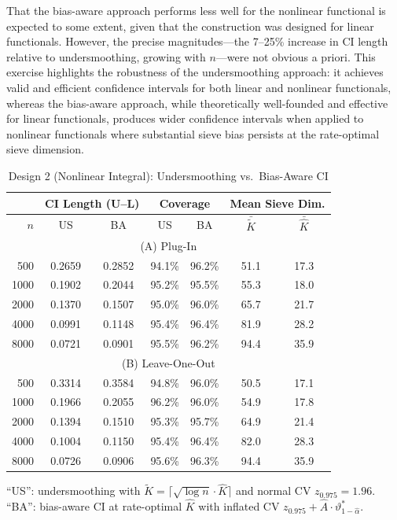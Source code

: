 \documentclass[12pt,american]{article}
\theoremstyle{definition}
\theoremstyle{plain}
\theoremstyle{definition}
\theoremstyle{plain}
\theoremstyle{plain}
\theoremstyle{plain}
\theoremstyle{plain}
\theoremstyle{plain}
\begin{document}
That the bias-aware approach performs less well for the nonlinear functional is expected to some extent, given that the construction was designed for linear functionals. However, the precise magnitudes---the 7--25\% increase in CI length relative to undersmoothing, growing with $n$---were not obvious a priori. This exercise highlights the robustness of the undersmoothing approach: it achieves valid and efficient confidence intervals for both linear and nonlinear functionals, whereas the bias-aware approach, while theoretically well-founded and effective for linear functionals, produces wider confidence intervals when applied to nonlinear functionals where substantial sieve bias persists at the rate-optimal sieve dimension.

\begin{table}[!h]
\centering
\caption{Design 2 (Nonlinear Integral): Undersmoothing vs.\ Bias-Aware CI}
\label{tab:BiasAware_Sim2}
\begin{tabular}{r|cc|cc|cc}
\toprule
 & \multicolumn{2}{c|}{CI Length (U--L)} & \multicolumn{2}{c|}{Coverage} & \multicolumn{2}{c}{Mean Sieve Dim.} \\
\midrule
$n$ & US & BA & US & BA & $\bar{\tilde{K}}$ & $\bar{\hat{K}}$ \\
\midrule
\multicolumn{7}{c}{(A) Plug-In} \\
\midrule
  500  & 0.2659 & 0.2852 & 94.1\% & 96.2\% & 51.1 & 17.3 \\
 1000  & 0.1902 & 0.2044 & 95.2\% & 95.5\% & 55.3 & 18.0 \\
 2000  & 0.1370 & 0.1507 & 95.0\% & 96.0\% & 65.7 & 21.7 \\
 4000  & 0.0991 & 0.1148 & 95.4\% & 96.4\% & 81.9 & 28.2 \\
 8000  & 0.0721 & 0.0901 & 95.5\% & 96.2\% & 94.4 & 35.9 \\
\midrule
\multicolumn{7}{c}{(B) Leave-One-Out} \\
\midrule
  500  & 0.3314 & 0.3584 & 94.8\% & 96.0\% & 50.5 & 17.1 \\
 1000  & 0.1966 & 0.2055 & 96.2\% & 96.0\% & 54.9 & 17.8 \\
 2000  & 0.1394 & 0.1510 & 95.3\% & 95.7\% & 64.9 & 21.4 \\
 4000  & 0.1004 & 0.1150 & 95.4\% & 96.4\% & 82.0 & 28.3 \\
 8000  & 0.0726 & 0.0906 & 95.6\% & 96.3\% & 94.4 & 35.9 \\
\bottomrule
\end{tabular}

\vspace{0.5em}
\parbox{\textwidth}{\footnotesize
``US'': undersmoothing with $\tilde{K} = \lceil\sqrt{\log n}\cdot\hat{K}\rceil$ and normal CV $z_{0.975}=1.96$.
``BA'': bias-aware CI at rate-optimal $\hat{K}$ with inflated CV $z_{0.975} + \hat{A}\cdot\vartheta^*_{1-\hat{\alpha}}$.
}
\end{table}
\end{document}

